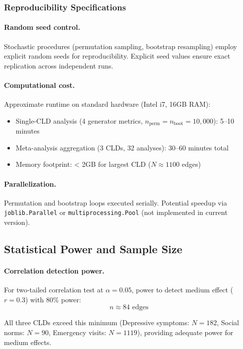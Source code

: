 \subsubsection{Reproducibility Specifications}

\paragraph{Random seed control.} Stochastic procedures (permutation sampling, bootstrap resampling) employ explicit random seeds for reproducibility. Explicit seed values ensure exact replication across independent runs.

\paragraph{Computational cost.} Approximate runtime on standard hardware (Intel i7, 16GB RAM):
\begin{itemize}
    \item Single-CLD analysis (4 generator metrics, \(n_{\text{perm}} = n_{\text{boot}} = 10{,}000\)): 5--10 minutes
    \item Meta-analysis aggregation (3 CLDs, 32 analyses): 30--60 minutes total
    \item Memory footprint: < 2GB for largest CLD (\(N \approx 1100\) edges)
\end{itemize}

\paragraph{Parallelization.} Permutation and bootstrap loops executed serially. Potential speedup via \texttt{joblib.Parallel} or \texttt{multiprocessing.Pool} (not implemented in current version).

\subsection{Statistical Power and Sample Size}

\paragraph{Correlation detection power.} For two-tailed correlation test at \(\alpha = 0.05\), power to detect medium effect (\(r = 0.3\)) with 80\% power:
\[
n \approx 84 \text{ edges}
\]

All three CLDs exceed this minimum (Depressive symptoms: \(N=182\), Social norms: \(N=90\), Emergency visits: \(N=1119\)), providing adequate power for medium effects.

